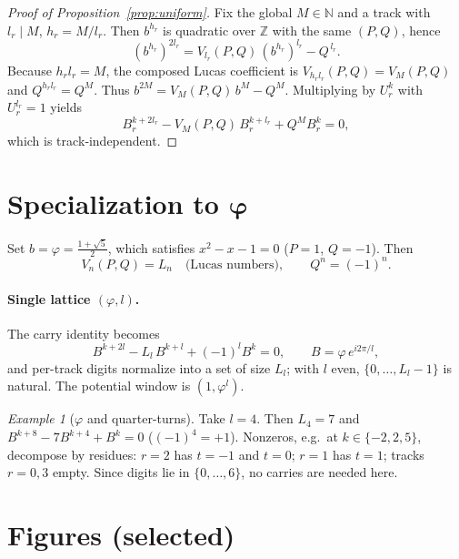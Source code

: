 \documentclass[11pt]{article}
\theoremstyle{definition}
\theoremstyle{remark}
\newtheorem{example}[theorem]{Example}
\newcommand{\Z}{\mathbb{Z}}
\newcommand{\N}{\mathbb{N}}
\begin{document}
\begin{proof}[Proof of Proposition~\ref{prop:uniform}]
Fix the global $M\in\N$ and a track with $l_r\mid M$, $h_r=M/l_r$. Then $b^{h_r}$ is quadratic over $\Z$ with the same $(P,Q)$, hence
\[
(b^{h_r})^{2l_r} = V_{l_r}(P,Q)\,(b^{h_r})^{l_r} - Q^{\,l_r}.
\]
Because $h_r l_r=M$, the composed Lucas coefficient is $V_{h_r l_r}(P,Q)=V_M(P,Q)$ and $Q^{h_r l_r}=Q^{M}$. Thus
$b^{2M}=V_M(P,Q)\,b^{M}-Q^{M}$. Multiplying by $U_r^{k}$ with $U_r^{l_r}=1$ yields
\[
B_r^{k+2l_r} - V_M(P,Q)\,B_r^{k+l_r} + Q^{M}B_r^{k}=0,
\]
which is track‑independent.
\end{proof}

\section{Specialization to $\boldsymbol\varphi$}\label{sec:phi}
Set $b=\varphi=\tfrac{1+\sqrt5}{2}$, which satisfies $x^2-x-1=0$ ($P=1$, $Q=-1$). Then
\[
V_n(P,Q)=L_n\quad\text{(Lucas numbers)},\qquad Q^{n}=(-1)^n.
\]
\paragraph{Single lattice $(\varphi,l)$.}
The carry identity becomes
\[
B^{k+2l}-L_l\,B^{k+l}+(-1)^l B^k=0,\qquad B=\varphi\,e^{i2\pi/l},
\]
and per-track digits normalize into a set of size $L_l$; with $l$ even, $\{0,\dots,L_l-1\}$ is natural. The potential window is $(1,\varphi^{l})$.

\begin{example}[$\varphi$ and quarter-turns]
Take $l=4$. Then $L_4=7$ and $B^{k+8}-7B^{k+4}+B^k=0$ ($(-1)^4=+1$).
Nonzeros, e.g.\ at $k\in\{-2,2,5\}$, decompose by residues:
$r=2$ has $t=-1$ and $t=0$; $r=1$ has $t=1$; tracks $r=0,3$ empty.
Since digits lie in $\{0,\dots,6\}$, no carries are needed here.
\end{example}

\section{Figures (selected)}
\end{document}
